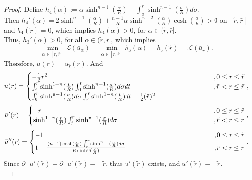 \begin{proof}
	Define $h_4(\alpha):=\alpha \sinh^{n-1}(\frac{\alpha}{R})-\int_{\alpha}^{\bar{r}} \sinh^{n-1}(\frac{\sigma}{R}) d\sigma$. \\
	Then $h_4'(\alpha)= 2\sinh^{n-1}(\frac{\alpha}{R}) +\frac{n-1}{R}\alpha  \sinh^{n-2}(\frac{\alpha}{R}) \cosh(\frac{\alpha}{R}) >0$  on $[\tilde{r}, \bar{r}]$ and $h_4(\tilde{r})=0$, which implies $h_4(\alpha)> 0$, for $\alpha \in (\tilde{r}, \bar{r}]$. \\
	Thus, $h_3'(\alpha)> 0$, for all $\alpha \in (\tilde{r}, \bar{r}]$, which implies
	\begin{equation*}
	\min\limits_{\alpha\in [\tilde{r}, \bar{r}]} \mathcal{L}(\bar{u}_{\alpha}) = \min\limits_{\alpha\in [\tilde{r}, \bar{r}]} h_3({\alpha}) = h_3(\tilde{r}) = \mathcal{L}(\bar{u}_{\tilde{r}}).
	\end{equation*}
	Therefore, $\bar{u}(r) = \bar{u}_{\tilde{r}}(r)$. And
	\begin{equation*}
	\bar{u}(r) =
	\begin{cases}
	-\frac{1}{2} r^2 & ,0\le r\le \tilde{r} \\
	\parbox[t]{.75\textwidth}{$\int_{\tilde{r}}^{r}\sinh^{1-n}(\frac{t}{R})\int_{0}^{t}\sinh^{n-1}(\frac{\sigma}{R})d\sigma dt - \int_{0}^{\bar{r}}\sinh^{n-1}(\frac{\sigma }{R})d \sigma  \int_{\tilde{r}}^{r}\sinh^{1-n}(\frac{t}{R}) d t -\frac{1}{2}(\tilde{r})^2 $} & ,\tilde{r} < r \le \bar{r} \\
	\end{cases},
	\end{equation*}
	\begin{equation*}
	\bar{u}'(r) =
	\begin{cases}
	- r & ,0\le r\le \tilde{r} \\
	\parbox[t]{.75\textwidth}{$\sinh^{1-n}(\frac{r}{R})\int_{\bar{r}}^r\sinh^{n-1}(\frac{\sigma}{R})d\sigma   $} & ,\tilde{r} < r \le \bar{r} \\
	\end{cases},
	\end{equation*}
	\begin{equation*}
	\bar{u}''(r) =
	\begin{cases}
	- 1 & ,0\le r\le \tilde{r} \\
	\parbox[t]{.75\textwidth}{$1-\frac{(n-1)\cosh(\frac{r}{R})\int_{\bar{r}}^r\sinh^{n-1}(\frac{\sigma}{R})d\sigma}{R\sinh^n(\frac{r}{R})}   $} & ,\tilde{r} < r \le \bar{r} \\
	\end{cases}.
	\end{equation*}
	Since $\partial_{-}\bar{u}'(\tilde{r})= \partial_{+}\bar{u}'(\tilde{r})= -\tilde{r}$, thus $\bar{u}'(\tilde{r})$ exists, and $\bar{u}'(\tilde{r})=-\tilde{r}$.\\

\end{proof}
